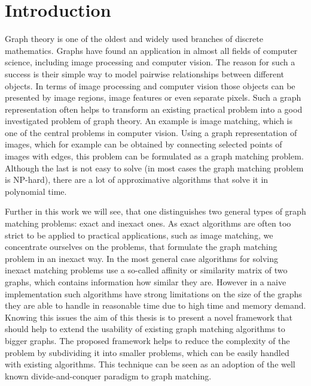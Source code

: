 \chapter{Introduction}
Graph theory is one of the oldest and widely used branches of discrete mathematics. Graphs have found an application in almost all fields of computer science, including image processing and computer vision. The reason for such a success is their simple way to model pairwise relationships between different objects. In terms of image processing and computer vision those objects can be presented by image regions, image features or even separate pixels. Such a graph representation often helps to transform an existing practical problem into a good investigated problem of graph theory. An example is image matching, which is one of the central problems in computer vision. %
Using a graph representation of images, which for example can be obtained by connecting selected points of images with edges, this problem can be formulated as a graph matching problem. Although the last is not easy to solve (in most cases the graph matching problem is NP-hard), there are a lot of approximative algorithms that solve it in polynomial time.

Further in this work we will see, that one distinguishes two general types of graph matching problems: exact and inexact ones. As exact algorithms are often too strict to be applied to practical applications, such as image matching, we concentrate ourselves on the problems, that formulate the graph matching problem in an inexact way.
In the most general case algorithms for solving inexact matching problems use a so-called affinity or similarity matrix of two graphs, which contains information how similar they are.
However in a naive implementation such algorithms have strong limitations on the size of the graphs they are able to handle in reasonable time due to high time and memory demand. Knowing this issues the aim of this thesis is to present a novel framework that should help to extend the usability of existing graph matching algorithms to bigger graphs. The proposed framework helps to reduce the complexity of the problem by subdividing it into smaller problems, which can be easily handled with existing algorithms. This technique can be seen as an adoption of the well known divide-and-conquer paradigm to graph matching.

